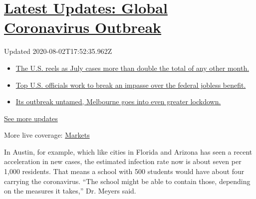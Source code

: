 \hypertarget{latest-updates-global-coronavirus-outbreak}{%
\section{\texorpdfstring{\href{https://www.nytimes.com/2020/08/01/world/coronavirus-covid-19.html?action=click\&pgtype=Article\&state=default\&region=MAIN_CONTENT_1\&context=storylines_live_updates}{Latest
Updates: Global Coronavirus
Outbreak}}{Latest Updates: Global Coronavirus Outbreak}}\label{latest-updates-global-coronavirus-outbreak}}

Updated 2020-08-02T17:52:35.962Z

\begin{itemize}
\tightlist
\item
  \href{https://www.nytimes.com/2020/08/01/world/coronavirus-covid-19.html?action=click\&pgtype=Article\&state=default\&region=MAIN_CONTENT_1\&context=storylines_live_updates\#link-34047410}{The
  U.S. reels as July cases more than double the total of any other
  month.}
\item
  \href{https://www.nytimes.com/2020/08/01/world/coronavirus-covid-19.html?action=click\&pgtype=Article\&state=default\&region=MAIN_CONTENT_1\&context=storylines_live_updates\#link-780ec966}{Top
  U.S. officials work to break an impasse over the federal jobless
  benefit.}
\item
  \href{https://www.nytimes.com/2020/08/01/world/coronavirus-covid-19.html?action=click\&pgtype=Article\&state=default\&region=MAIN_CONTENT_1\&context=storylines_live_updates\#link-2bc8948}{Its
  outbreak untamed, Melbourne goes into even greater lockdown.}
\end{itemize}

\href{https://www.nytimes.com/2020/08/01/world/coronavirus-covid-19.html?action=click\&pgtype=Article\&state=default\&region=MAIN_CONTENT_1\&context=storylines_live_updates}{See
more updates}

More live coverage:
\href{https://www.nytimes.com/live/2020/07/31/business/stock-market-today-coronavirus?action=click\&pgtype=Article\&state=default\&region=MAIN_CONTENT_1\&context=storylines_live_updates}{Markets}

In Austin, for example, which like cities in Florida and Arizona has
seen a recent acceleration in new cases, the estimated infection rate
now is about seven per 1,000 residents. That means a school with 500
students would have about four carrying the coronavirus. ``The school
might be able to contain those, depending on the measures it takes,''
Dr. Meyers said.

